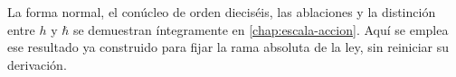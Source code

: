 La forma normal, el conúcleo de orden dieciséis, las ablaciones y la
distinción entre \(h\) y \(\hbar\) se demuestran íntegramente en
\cref{chap:escala-accion}. Aquí se emplea ese resultado ya construido para
fijar la rama absoluta de la ley, sin reiniciar su derivación.
\begingroup
\let\chapter\section
\let\section\subsection
\let\subsection\subsubsection
\let\subsubsection\paragraph
\let\clearpage\relax

\endgroup
\begingroup
\let\chapter\section
\let\section\subsection
\let\subsection\subsubsection
